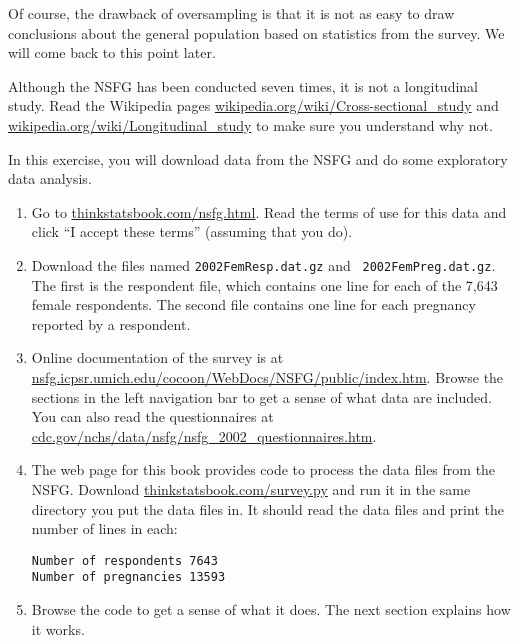 \documentclass[10pt]{book}
\begin{document}
Of course, the drawback of oversampling is that it is not as easy
to draw conclusions about the general population based on statistics
from the survey.  We will come back to this point later.

\begin{ex}

Although the NSFG has been conducted seven times, it is not a
longitudinal study.  Read the Wikipedia pages
\url{wikipedia.org/wiki/Cross-sectional_study}
and
\url{wikipedia.org/wiki/Longitudinal_study}
to make sure you understand why not.

\end{ex}

\begin{ex}

In this exercise, you will download data from the NSFG and do some
exploratory data analysis.

\begin{enumerate}

\item Go to \url{thinkstatsbook.com/nsfg.html}.  Read the terms of
use for this data and click ``I accept these terms'' (assuming that you do).

\item Download the files named {\tt 2002FemResp.dat.gz} and {\tt
  2002FemPreg.dat.gz}.  The first is the respondent file, which contains
  one line for each of the 7,643 female respondents.
  The second file contains one line for each pregnancy reported by a
  respondent.

\item Online documentation of the survey is at
  \url{nsfg.icpsr.umich.edu/cocoon/WebDocs/NSFG/public/index.htm}.
  Browse the sections in the left navigation bar to get a sense of
  what data are included.  You can also read the questionnaires
  at \url{cdc.gov/nchs/data/nsfg/nsfg_2002_questionnaires.htm}.

\item The web page for this book provides code to process the data
  files from the NSFG.  Download \url{thinkstatsbook.com/survey.py}
  and run it in the same directory you put the data files in.  It
  should read the data files and print the number of lines in each:

\begin{verbatim}
Number of respondents 7643
Number of pregnancies 13593
\end{verbatim}

\item Browse the code to get a sense of what it does.  The next
section explains how it works.

\end{enumerate}

\end{ex}
\end{document}
